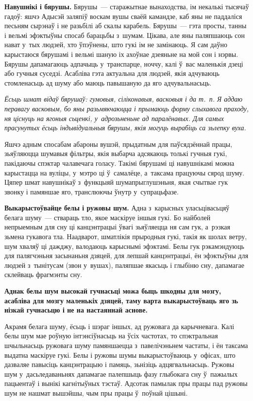 \textbf{Навушнікі і бярушы.} Бярушы~--- старажытнае вынаходства, ім некалькі тысячаў гадоў: яшчэ Адысэй заляпіў воскам вушы сваёй камандзе, каб яны не паддаліся песьням сырэнаў і не разьбілі аб скалы карабель. Бярушы~--- гэта просты, танны і вельмі эфэктыўны спосаб барацьбы з~шумам. Цікава, але яны паляпшаюць сон нават у~тых людзей, хто ўпэўнены, што гукі ім не замінаюць. Я сам даўно карыстаюся бярушамі і вельмі шаную іх ахоўнае дзеяньне на мой сон і нэрвы. Бярушы дапамагаюць адпачыць у~транспарце, ноччу, калі ў~вас маленькія дзеці або гучныя суседзі. Асабліва гэта актуальна для людзей, якія адчуваюць стомленасьць ад шуму або маюць павышаную да яго адчувальнасьць.

\emph{Ёсьць шмат відаў бярушаў: гумовыя, сіліконавыя, васковыя і да т.~п. Я аддаю перавагу васковым, бо яны разьмякчаюцца і прымаюць форму слыхавога праходу, ня ціснуць на ягоныя сьценкі, у~адрозьненьне ад паралёнавых. Для самых прасунутых ёсьць індывідуальныя бярушы, якія могуць вырабіць са зьлепку вуха.}

Яшчэ адным спосабам абароны вушэй, прыдатным для паўсядзённай працы, зьяўляюцца шумавыя фільтры, якія выбарча адсякаюць толькі гучныя гукі, пакідаючы спэктар чалавечага голасу. Такімі бярушамі ці навушнікамі можна карыстацца на вуліцы, у~мэтро ці ў~самалёце, а~таксама працуючы сярод шуму. Цяпер шмат навушнікаў з~функцыяй шумапрыглушэньня, якая счытвае гук звонку і памяншае яго, транслюючы ўнутр у~супрацьфазе.

\textbf{Выкарыстоўвайце белы і ружовы шум.} Адна з~карысных уласьцівасьцяў белага шуму~--- ствараць тло, якое маскіруе іншыя гукі. Бо найболей непрыемным для сну ці канцэнтрацыі ўвагі зьяўляецца ня сам гук, а~рэзкая зьмена гукавога тла. Наадварот, шматлікія прыродныя гукі, такія як шолах ветру, шум хваляў ці дажджу, валодаюць карыснымі эфэктамі. Белы гук рэкамэндуюць для палягчэньня засынаньня дзяцей, для лепшай канцэнтрацыі, ён эфэктыўны для людзей з~тынітусам (звон у~вушах), паляпшае якасьць і глыбіню сну, дапамагае склейваць фрагмэнты сну.

\textbf{Аднак белы шум высокай гучнасьці можа быць шкодны для мозгу, асабліва для мозгу маленькіх дзяцей, таму варта выкарыстоўваць яго зь нізкай гучнасьцю і не на настаяннай аснове.}

Акрамя белага шуму, ёсьць і шэраг іншых, ад ружовага да карычневага. Калі белы шум мае роўную інтэнсіўнасьць на ўсіх частотах, то спэктральная шчыльнасьць ружовага шуму памяншаецца з~павелічэньнем частаты, і ён таксама выдатна маскіруе гукі. Белы і ружовы шумы выкарыстоўваюць у~офісах, што дазваляе павысіць канцэнтрацыю і памяць, зьнізіць адцягвальнасьць. Ружовы шум у~дасьледаваньнях дапамагае палепшыць фазу глыбокага сну ў~пажылых пацыентаў і вынікі кагнітыўных тэстаў. Адсотак памылак пры працы пад ружовы шум не нашмат вышэйшы, чым пры працы ў~поўнай цішыні.


